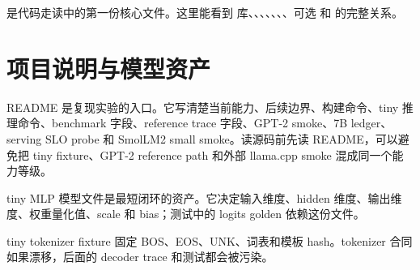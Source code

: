  是代码走读中的第一份核心文件。这里能看到  库、、、、、、、可选  和  的完整关系。



\section{项目说明与模型资产}

README 是复现实验的入口。它写清楚当前能力、后续边界、构建命令、tiny 推理命令、benchmark 字段、reference trace 字段、GPT-2 smoke、7B ledger、serving SLO probe 和 SmolLM2 small smoke。读源码前先读 README，可以避免把 tiny fixture、GPT-2 reference path 和外部 llama.cpp smoke 混成同一个能力等级。



tiny MLP 模型文件是最短闭环的资产。它决定输入维度、hidden 维度、输出维度、权重量化值、scale 和 bias；测试中的 logits golden 依赖这份文件。



tiny tokenizer fixture 固定 BOS、EOS、UNK、词表和模板 hash。tokenizer 合同如果漂移，后面的 decoder trace 和测试都会被污染。


